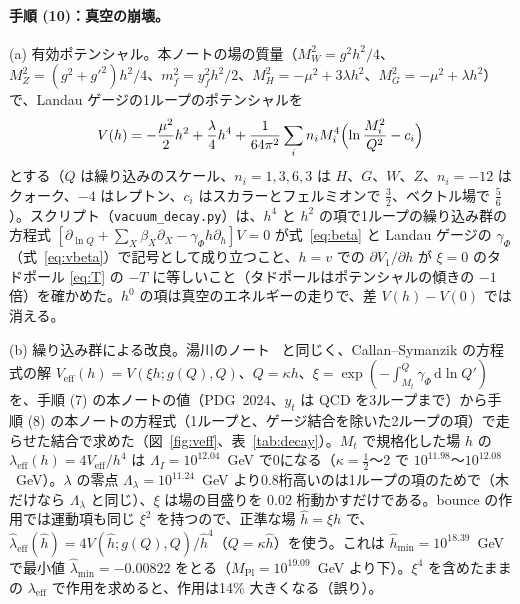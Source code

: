 \documentclass[a4paper,10pt]{ltjsarticle}
\newcommand{\dd}{\mathrm{d}}
\begin{document}
\paragraph{手順 (10)：真空の崩壊。}(a) 有効ポテンシャル。本ノートの場の質量（$M_W^2=g^2h^2/4$、$M_Z^2=(g^2+g'^2)h^2/4$、$m_f^2=y_f^2h^2/2$、$M_H^2=-\mu^2+3\lambda h^2$、$M_G^2=-\mu^2+\lambda h^2$）で、Landau ゲージの1ループのポテンシャルを
\begin{equation}
V(h)=-\frac{\mu^2}2h^2+\frac\lambda4h^4+\frac1{64\pi^2}\sum_in_iM_i^4\Bigl(\ln\frac{M_i^2}{Q^2}-c_i\Bigr)
\label{eq:veff}
\end{equation}
とする（$Q$ は繰り込みのスケール、$n_i=1,3,6,3$ は $H$、$G$、$W$、$Z$、$n_i=-12$ はクォーク、$-4$ はレプトン、$c_i$ はスカラーとフェルミオンで $\frac32$、ベクトル場で $\frac56$）。スクリプト（\texttt{vacuum\_decay.py}）は、$h^4$ と $h^2$ の項で1ループの繰り込み群の方程式 $[\partial_{\ln Q}+\sum_X\beta_X\partial_X-\gamma_\Phi h\partial_h]V=0$ が式~\eqref{eq:beta} と Landau ゲージの $\gamma_\Phi$（式~\eqref{eq:vbeta}）で記号として成り立つこと、$h=v$ での $\partial V_1/\partial h$ が $\xi=0$ のタドポール \eqref{eq:T} の $-T$ に等しいこと（タドポールはポテンシャルの傾きの $-1$ 倍）を確かめた。$h^0$ の項は真空のエネルギーの走りで、差 $V(h)-V(0)$ では消える。

(b) 繰り込み群による改良。湯川のノート~\cite{yukawanote} と同じく、Callan--Symanzik の方程式の解 $V_{\mathrm{eff}}(h)=V(\xi h;g(Q),Q)$、$Q=\kappa h$、$\xi=\exp(-\int_{M_t}^{Q}\gamma_\Phi\,\dd\ln Q')$ を、手順 (7) の本ノートの値（PDG~2024、$y_t$ は QCD を3ループまで）から手順 (8) の本ノートの方程式（1ループと、ゲージ結合を除いた2ループの項）で走らせた結合で求めた（図~\ref{fig:veff}、表~\ref{tab:decay}）。$M_t$ で規格化した場 $h$ の $\lambda_{\mathrm{eff}}(h)=4V_{\mathrm{eff}}/h^4$ は $\Lambda_I=10^{12.04}$~GeV で0になる（$\kappa=\frac12$〜2 で $10^{11.98}$〜$10^{12.08}$~GeV）。$\lambda$ の零点 $\Lambda_\lambda=10^{11.24}$~GeV より0.8桁高いのは1ループの項のためで（木だけなら $\Lambda_\lambda$ と同じ）、$\xi$ は場の目盛りを $0.02$ 桁動かすだけである。bounce の作用では運動項も同じ $\xi^2$ を持つので、正準な場 $\hat h=\xi h$ で、$\hat\lambda_{\mathrm{eff}}(\hat h)=4V(\hat h;g(Q),Q)/\hat h^4$（$Q=\kappa\hat h$）を使う。これは $\hat h_{\min}=10^{18.39}$~GeV で最小値 $\hat\lambda_{\min}=-0.00822$ をとる（$M_{\mathrm{Pl}}=10^{19.09}$~GeV より下）。$\xi^4$ を含めたままの $\lambda_{\mathrm{eff}}$ で作用を求めると、作用は14\% 大きくなる（誤り）。
\end{document}
